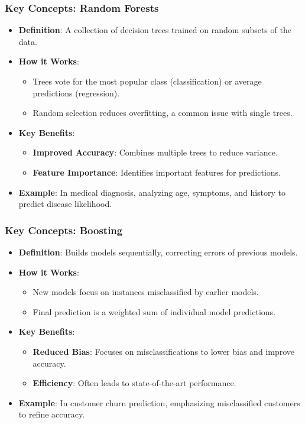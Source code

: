 \documentclass[aspectratio=169]{beamer}
\begin{document}
\begin{frame}[fragile]
    \frametitle{Key Concepts: Random Forests}
    \begin{itemize}
        \item \textbf{Definition}: A collection of decision trees trained on random subsets of the data.
        \item \textbf{How it Works}:
            \begin{itemize}
                \item Trees vote for the most popular class (classification) or average predictions (regression).
                \item Random selection reduces overfitting, a common issue with single trees.
            \end{itemize}
        \item \textbf{Key Benefits}:
            \begin{itemize}
                \item \textbf{Improved Accuracy}: Combines multiple trees to reduce variance.
                \item \textbf{Feature Importance}: Identifies important features for predictions.
            \end{itemize}
        \item \textbf{Example}: In medical diagnosis, analyzing age, symptoms, and history to predict disease likelihood.
    \end{itemize}
\end{frame}

\begin{frame}[fragile]
    \frametitle{Key Concepts: Boosting}
    \begin{itemize}
        \item \textbf{Definition}: Builds models sequentially, correcting errors of previous models.
        \item \textbf{How it Works}:
            \begin{itemize}
                \item New models focus on instances misclassified by earlier models.
                \item Final prediction is a weighted sum of individual model predictions.
            \end{itemize}
        \item \textbf{Key Benefits}:
            \begin{itemize}
                \item \textbf{Reduced Bias}: Focuses on misclassifications to lower bias and improve accuracy.
                \item \textbf{Efficiency}: Often leads to state-of-the-art performance.
            \end{itemize}
        \item \textbf{Example}: In customer churn prediction, emphasizing misclassified customers to refine accuracy.
    \end{itemize}
\end{frame}
\end{document}
